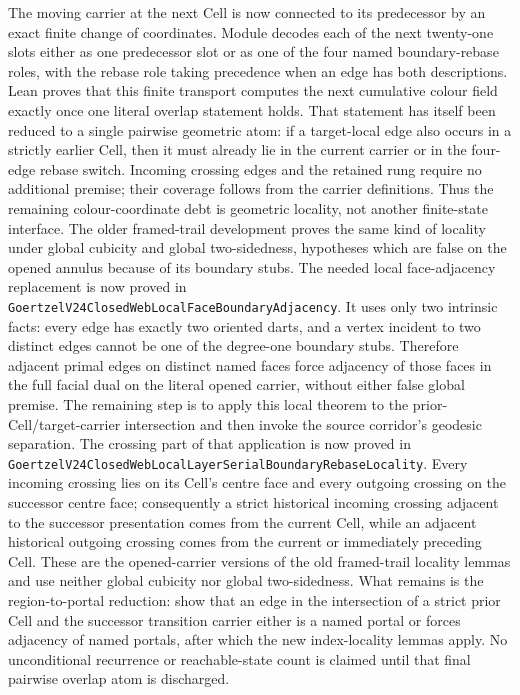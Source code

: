 \documentclass[11pt]{article}
\theoremstyle{definition}
\begin{document}
The moving carrier at the next Cell is now connected to its predecessor by an
exact finite change of coordinates.  Module
decodes each of the next twenty-one slots either as one predecessor slot or as
one of the four named boundary-rebase roles, with the rebase role taking
precedence when an edge has both descriptions.  Lean proves that this finite
transport computes the next cumulative colour field exactly once one literal
overlap statement holds.  That statement has itself been reduced to a single
pairwise geometric atom: if a target-local edge also occurs in a strictly
earlier Cell, then it must already lie in the current carrier or in the
four-edge rebase switch.  Incoming crossing edges and the retained rung require
no additional premise; their coverage follows from the carrier definitions.
Thus the remaining colour-coordinate debt is geometric locality, not another
finite-state interface.  The older framed-trail development proves the same
kind of locality under global cubicity and global two-sidedness, hypotheses
which are false on the opened annulus because of its boundary stubs.  The
needed local face-adjacency replacement is now proved in
\texttt{GoertzelV24ClosedWebLocalFaceBoundaryAdjacency}.  It uses only two
intrinsic facts: every edge has exactly two oriented darts, and a vertex
incident to two distinct edges cannot be one of the degree-one boundary stubs.
Therefore adjacent primal edges on distinct named faces force adjacency of
those faces in the full facial dual on the literal opened carrier, without
either false global premise.  The remaining step is to apply this local
theorem to the prior-Cell/target-carrier intersection and then invoke the
source corridor's geodesic separation.  The crossing part of that application
is now proved in
\texttt{GoertzelV24ClosedWebLocalLayerSerialBoundaryRebaseLocality}.
Every incoming crossing lies on its Cell's centre face and every outgoing
crossing on the successor centre face; consequently a strict historical
incoming crossing adjacent to the successor presentation comes from the
current Cell, while an adjacent historical outgoing crossing comes from the
current or immediately preceding Cell.  These are the opened-carrier versions
of the old framed-trail locality lemmas and use neither global cubicity nor
global two-sidedness.  What remains is the region-to-portal reduction: show
that an edge in the intersection of a strict prior Cell and the successor
transition carrier either is a named portal or forces adjacency of named
portals, after which the new index-locality lemmas apply.  No unconditional
recurrence or reachable-state count is claimed until that final pairwise
overlap atom is discharged.
\end{document}
